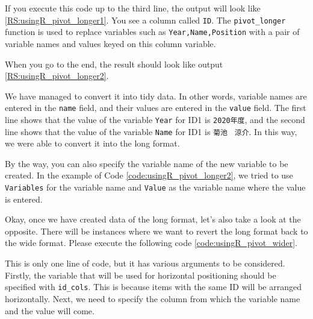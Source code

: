 \documentclass{ltjsbook}
\begin{document}


If you execute this code up to the third line, the output will look like \ref{RS:usingR_pivot_longer1}. You see a column called \verb|ID|. The \verb|pivot_longer| function is used to replace variables such as \verb|Year,Name,Position| with a pair of variable names and values keyed on this column variable.

When you go to the end, the result should look like output \ref{RS:usingR_pivot_longer2}.

We have managed to convert it into tidy data. In other words, variable names are entered in the \verb|name| field, and their values are entered in the \verb|value| field. The first line shows that the value of the variable \verb|Year| for ID1 is \verb|2020年度|, and the second line shows that the value of the variable \verb|Name| for ID1 is \verb|菊池　涼介|. In this way, we were able to convert it into the long format.

By the way, you can also specify the variable name of the new variable to be created. In the example of Code \ref{code:usingR_pivot_longer2}, we tried to use \verb|Variables| for the variable name and \verb|Value| as the variable name where the value is entered.


Okay, once we have created data of the long format, let's also take a look at the opposite. There will be instances where we want to revert the long format back to the wide format. Please execute the following code \ref{code:usingR_pivot_wider}.

This is only one line of code, but it has various arguments to be considered. Firstly, the variable that will be used for horizontal positioning should be specified with \verb|id_cols|. This is because items with the same ID will be arranged horizontally. Next, we need to specify the column from which the variable name and the value will come.
\end{document}
